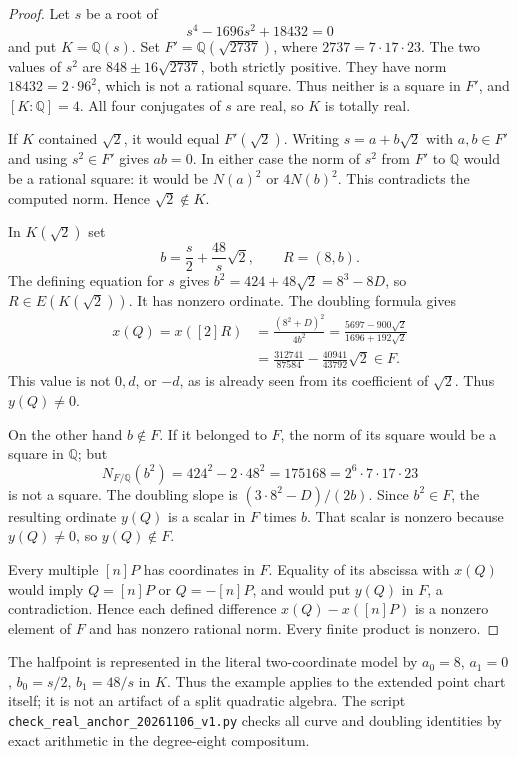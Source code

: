 \documentclass[11pt]{article}
\theoremstyle{definition}
\begin{document}
\begin{proof}
Let $s$ be a root of
\[
                         s^4-1696s^2+18432=0
\]
and put $K=\mathbb Q(s)$.  Set $F'=\mathbb Q(\sqrt{2737})$,
where $2737=7\cdot17\cdot23$.  The two values of $s^2$ are
$848\pm16\sqrt{2737}$, both strictly positive.  They have
norm $18432=2\cdot96^2$, which is not a rational square.
Thus neither is a square in $F'$, and $[K:\mathbb Q]=4$.
All four conjugates of $s$ are real, so $K$ is totally real.

If $K$ contained $\sqrt2$, it would equal $F'(\sqrt2)$.
Writing $s=a+b\sqrt2$ with $a,b\in F'$ and using
$s^2\in F'$ gives $ab=0$.  In either case the norm of
$s^2$ from $F'$ to $\mathbb Q$ would be a rational square:
it would be $N(a)^2$ or $4N(b)^2$.  This contradicts the
computed norm.  Hence $\sqrt2\notin K$.

In $K(\sqrt2)$ set
\[
                  b=\frac{s}{2}+\frac{48}{s}\sqrt2,
                          \qquad R=(8,b).
\]
The defining equation for $s$ gives
$b^2=424+48\sqrt2=8^3-8D$, so $R\in E(K(\sqrt2))$.
It has nonzero ordinate.  The doubling formula gives
\begin{align*}
 x(Q)=x([2]R)
   &=\frac{(8^2+D)^2}{4b^2}
     =\frac{5697-900\sqrt2}{1696+192\sqrt2}\\
   &=\frac{312741}{87584}
                          -\frac{40941}{43792}\sqrt2\in F.
\end{align*}
This value is not $0,d$, or $-d$, as is already seen from
its coefficient of $\sqrt2$.  Thus $y(Q)\ne0$.

On the other hand $b\notin F$.  If it belonged to $F$, the
norm of its square would be a square in $\mathbb Q$; but
\[
           N_{F/\mathbb Q}(b^2)=424^2-2\cdot48^2
                           =175168=2^6\cdot7\cdot17\cdot23
\]
is not a square.  The doubling slope is
$(3\cdot8^2-D)/(2b)$.  Since $b^2\in F$, the resulting
ordinate $y(Q)$ is a scalar in $F$ times $b$.  That scalar
is nonzero because $y(Q)\ne0$, so $y(Q)\notin F$.

Every multiple $[n]P$ has coordinates in $F$.  Equality of
its abscissa with $x(Q)$ would imply
$Q=[n]P$ or $Q=-[n]P$, and would put $y(Q)$ in $F$, a
contradiction.  Hence each defined difference
$x(Q)-x([n]P)$ is a nonzero element of $F$ and has nonzero
rational norm.  Every finite product is nonzero.
\end{proof}

The halfpoint is represented in the literal two-coordinate
model by $a_0=8$, $a_1=0$, $b_0=s/2$, $b_1=48/s$ in $K$.
Thus the example applies to the extended point chart itself;
it is not an artifact of a split quadratic algebra.
The script \nolinkurl{check_real_anchor_20261106_v1.py}
checks all curve and doubling identities by exact arithmetic
in the degree-eight compositum.
\end{document}
